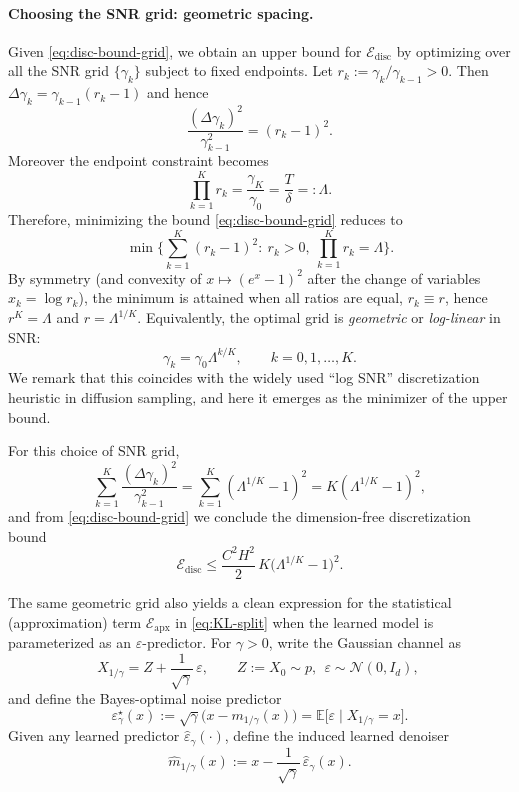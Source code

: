 \documentclass[11pt]{article}
\theoremstyle{definition}
\newcommand{\E}{\mathbb{E}}
\numberwithin{equation}{section}
\begin{document}
\paragraph{Choosing the SNR grid: geometric spacing.}
Given \eqref{eq:disc-bound-grid}, we obtain an upper bound for $\mathcal E_{\mathrm{disc}}$ by optimizing over all the SNR grid $\{\gamma_k\}$ subject to fixed endpoints.
Let $r_k := \gamma_k/\gamma_{k-1}>0$. Then
\(
\Delta\gamma_k = \gamma_{k-1}(r_k-1)
\)
and hence
\[
\frac{(\Delta\gamma_k)^2}{\gamma_{k-1}^2} = (r_k-1)^2.
\]
Moreover the endpoint constraint becomes
\[
\prod_{k=1}^K r_k = \frac{\gamma_K}{\gamma_0} =\frac{T}{\delta}=: \Lambda.
\]
Therefore, minimizing the bound \eqref{eq:disc-bound-grid} reduces to
\[
\min\Big\{\sum_{k=1}^K (r_k-1)^2:\ r_k>0,\ \prod_{k=1}^K r_k = \Lambda\Big\}.
\]
By symmetry (and convexity of $x\mapsto (e^x-1)^2$ after the change of variables $x_k=\log r_k$),
the minimum is attained when all ratios are equal, $r_k\equiv r$, hence $r^K=\Lambda$ and $r=\Lambda^{1/K}$.
Equivalently, the optimal grid is \emph{geometric} or \emph{log-linear} in SNR:
\begin{equation}\label{eq:gamma-geometric}
\gamma_k = \gamma_0 \Lambda^{k/K},\qquad k=0,1,\dots,K.
\end{equation}
We remark that this coincides with the widely used ``log SNR'' discretization heuristic in diffusion sampling, and here it emerges as the minimizer of the upper bound.

For this choice of SNR grid,
\[
\sum_{k=1}^K \frac{(\Delta\gamma_k)^2}{\gamma_{k-1}^2}
= \sum_{k=1}^K (\Lambda^{1/K}-1)^2
= K(\Lambda^{1/K}-1)^2,
\]
and from \eqref{eq:disc-bound-grid} we conclude the dimension-free discretization bound
\begin{equation}\label{eq:disc-final-bound}
\mathcal E_{\mathrm{disc}}
\le
\frac{C^2H^2}{2}\,K\big(\Lambda^{1/K}-1\big)^2.
\end{equation}

The same geometric grid also yields a clean expression for the statistical (approximation) term
$\mathcal E_{\mathrm{apx}}$ in \eqref{eq:KL-split} when the learned model is parameterized as an
$\varepsilon$-predictor.  For $\gamma>0$, write the Gaussian channel as
\[
X_{1/\gamma}=Z+\frac{1}{\sqrt{\gamma}}\,\varepsilon,\qquad Z:=X_0\sim p,\ \ \varepsilon\sim\mathcal N(0,I_d),\ 
\]
and define the Bayes-optimal noise predictor
\[
\varepsilon_\gamma^\star(x):=\sqrt{\gamma}\bigl(x-m_{1/\gamma}(x)\bigr)=\E\bigl[\varepsilon \mid X_{1/\gamma}=x\bigr].
\]
Given any learned predictor $\hat\varepsilon_\gamma(\cdot)$, define the induced learned denoiser
\[
\hat m_{1/\gamma}(x):=x-\frac{1}{\sqrt{\gamma}}\,\hat\varepsilon_\gamma(x).
\]
\end{document}
